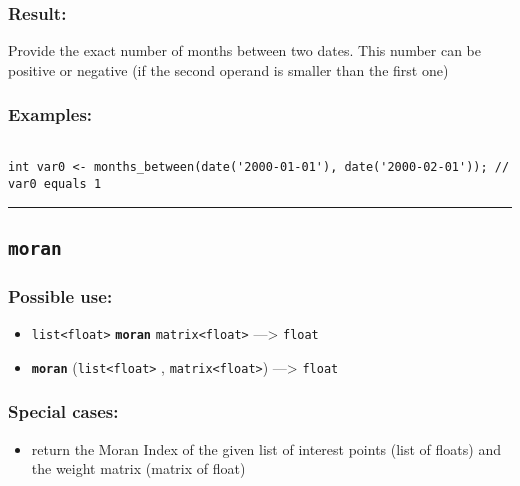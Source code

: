 \documentclass[]{book}
\providecommand{\tightlist}{%
  \setlength{\itemsep}{0pt}\setlength{\parskip}{0pt}}
\theoremstyle{definition}
\theoremstyle{definition}
\theoremstyle{definition}
\theoremstyle{remark}
\begin{document}
\subsubsection{Result:}\label{result-351}

Provide the exact number of months between two dates. This number can be
positive or negative (if the second operand is smaller than the first
one)

\subsubsection{Examples:}\label{examples-251}

\begin{verbatim}
 
int var0 <- months_between(date('2000-01-01'), date('2000-02-01')); // var0 equals 1
\end{verbatim}

\begin{center}\rule{0.5\linewidth}{\linethickness}\end{center}

\subsection{\texorpdfstring{\texttt{moran}}{moran}}\label{moran}

\subsubsection{Possible use:}\label{possible-use-363}

\begin{itemize}
\tightlist
\item
  \texttt{list\textless{}float\textgreater{}} \textbf{\texttt{moran}}
  \texttt{matrix\textless{}float\textgreater{}} ---\textgreater{}
  \texttt{float}
\item
  \textbf{\texttt{moran}} (\texttt{list\textless{}float\textgreater{}} ,
  \texttt{matrix\textless{}float\textgreater{}}) ---\textgreater{}
  \texttt{float}
\end{itemize}

\subsubsection{Special cases:}\label{special-cases-101}

\begin{itemize}
\tightlist
\item
  return the Moran Index of the given list of interest points (list of
  floats) and the weight matrix (matrix of float)
\end{itemize}
\end{document}
